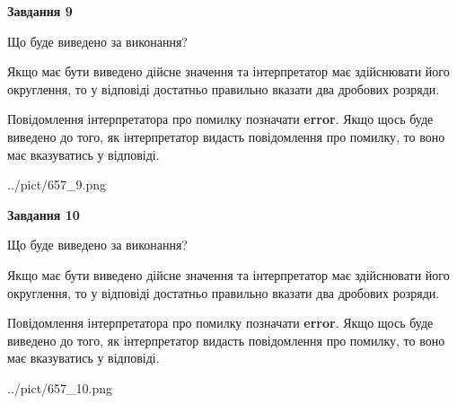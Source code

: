 \documentclass[12pt, ukrainian]{article}
\begin{document}
{\begin {Large}
{\begin {center}\textbf{Завдання 9}\end {center}}\par
Що буде виведено за виконання? \par

Якщо має бути виведено дійсне значення та інтерпретатор має здійснювати його округлення, 
то у відповіді достатньо правильно вказати два дробових розряди.

Повідомлення інтерпретатора про помилку позначати \textbf{error}.
Якщо щось буде виведено до того, як інтерпретатор видасть повідомлення про помилку, 
то воно має вказуватись у відповіді. \par

\begin{center}
	{../pict/657_9.png}
\end{center}
\newpage

{\begin {center}\textbf{Завдання 10}\end {center}}\par
Що буде виведено за виконання? \par

Якщо має бути виведено дійсне значення та інтерпретатор має здійснювати його округлення, 
то у відповіді достатньо правильно вказати два дробових розряди.

Повідомлення інтерпретатора про помилку позначати \textbf{error}.
Якщо щось буде виведено до того, як інтерпретатор видасть повідомлення про помилку, 
то воно має вказуватись у відповіді. \par

\begin{center}
	{../pict/657_10.png}
\end{center}
\newpage

\end {Large}}
\end{document}
